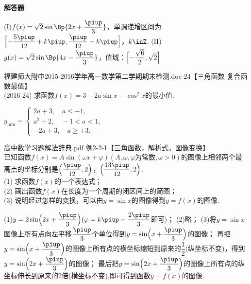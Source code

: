 \begin{exercise}{\bf 解答题}
\begin{minipage}[h]{0.3\linewidth}
\begin{center}
        \end{center}
      \end{minipage}
      \begin{answer}
        (I)$f(x)=\sqrt2\sin\Bp{2x+\dfrac{\piup}3}$，单调递增区间为$\Bigl[-\dfrac{5\piup}{12}+k\piup,\dfrac{\piup}{12}+k\piup\Bigr]$，$k\inZ$.
        (II)$g(x)=\sqrt2\sin\Bp{4x-\dfrac{\piup}3}$，值域：$\Bigl[-\dfrac{\sqrt6}2,\sqrt2\Bigr]$
      \end{answer}
    \item 福建师大附中2015-2016学年高一数学第二学期期末检测.doc-24【三角函数 复合函数最值】\\
      (2016  24)
      求函数$f(x)=3-2a\sin x-\cos^2x$的最小值.
      \begin{answer}
        $y_{\min}=\begin{cases}
          2a+3,\quad a\leqslant-1,\\
          a^2+2,\quad -1<a<1,\\
          -2a+3,\quad a\geqslant+3.
        \end{cases}$
      \end{answer}
    \item 高中数学习题解法辞典.pdf 例2-2-1【三角函数，解析式，图像变换】\\
      已知函数$f(x)=A\sin(\omega x+\varphi)(A,\omega,\varphi\text{为常数},\omega>0)$的图像上相邻两个最高点的坐标分别是$\Bigl(\dfrac{\piup}{12},2\Bigr)$，$\Bigl(\dfrac{13\piup}{12},2\Bigr)$.\\
      (1) 求函数$f(x)$的一个表达式；\\
      (2) 画出函数$f(x)$在长度为一个周期的闭区间上的简图；\\
      (3) 说明经过怎样的变换，可以由$y=\sin x$的图像得到$y=f(x)$的图像.
      \begin{answer}
        (1)$y=2\sin\Bigl(2x+\dfrac{\piup}3\Bigr)(\varphi=k\piup-\dfrac{2\piup}3$即可)；
        (2)略；
        (3)将$y=\sin x$图像上所有点向左平移$\dfrac{\piup}3$个单位得到$y=\sin \Bigl(x+\dfrac{\piup}3\Bigr)$的图像；
        再把$y=\sin \Bigl(x+\dfrac{\piup}3\Bigr)$的图像上所有点的横坐标缩短到原来的$\dfrac12$(纵坐标不变)，得到$y=\sin \Bigl(2x+\dfrac{\piup}3\Bigr)$的图像；
        最后把$y=\sin \Bigl(2x+\dfrac{\piup}3\Bigr)$的图像上所有点的纵坐标伸长到原来的2倍(横坐标不变),即可得到函数$y=f(x)$的图像.

\end{answer}
\end{exercise}
